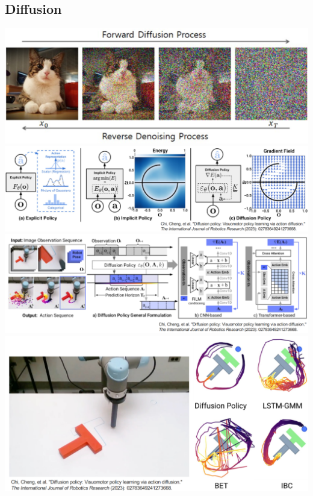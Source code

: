 \documentclass[10pt]{article}
\begin{document}
\subsection*{Diffusion}
\begin{center}
    \includegraphics*[width=\textwidth]{L2_19.png} \\
    \includegraphics*[width=\textwidth]{L2_20.png} \\
    \includegraphics*[width=\textwidth]{L2_21.png} \\
    \includegraphics*[width=\textwidth]{L2_22.png}
\end{center}
\end{document}
